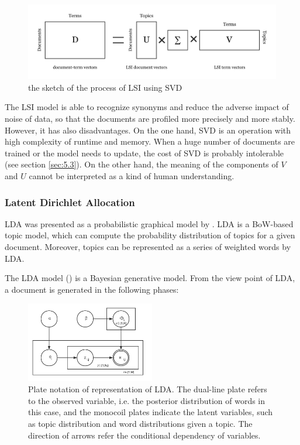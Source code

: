 \begin{figure}[!htb]
    \centering
    \includegraphics[width=1\textwidth]{fig/SVD.pdf}
    \caption{the sketch of the process of LSI using SVD}
    \label{fig:svd}
\end{figure}

The LSI model is able to recognize synonyms and reduce the adverse impact of noise of data, so that the documents are profiled more precisely and more stably.  However, it has also disadvantages. On the one hand, SVD is an operation with high complexity of runtime and memory. When a huge number of documents are trained or the model needs to update, the cost of SVD is probably intolerable (see section \ref{sec:5.3}). On the other hand, the meaning of the components of $V$ and $U$ cannot be interpreted as a kind of human understanding. 

\subsubsection{Latent Dirichlet Allocation}

LDA was presented as a probabilistic graphical model by \cite{Blei:2003}. LDA is a BoW-based topic model, which can compute the probability distribution of topics for a given document. Moreover, topics can be represented as a series of weighted words by LDA. 

The LDA model (\cite{Blei:2003}) is a Bayesian generative model. From the view point of LDA, a document is generated in the following phases: 

\begin{figure}[!htb]
    \centering
    \includegraphics[width=0.5\textwidth]{fig/lda.pdf}
    \caption{Plate notation of representation of LDA. The dual-line plate refers to the observed variable, i.e. the posterior distribution of words in this case, and the monocoil plates indicate the latent variables, such as topic distribution and word distributions given a topic. The direction of arrows refer the conditional dependency of variables. }
    \label{fig:lda}
\end{figure}

